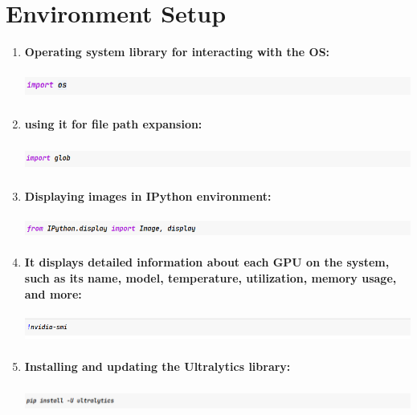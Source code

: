 \documentclass[12 pt]{report}
\begin{document}
\section{Environment Setup}
 {
  \begin{enumerate}
    \item \textbf{ Operating system library for interacting with the OS:}
          \begin{center}
            \includegraphics[width=17cm, height=1cm]{import Os.png}
          \end{center}

    \item \textbf{using it for file path expansion:}
          \begin{center}
            \includegraphics[width=17cm, height=1cm]{Import global.png}
          \end{center}

    \item \textbf{Displaying images in IPython environment:}
          \begin{center}
            \includegraphics[width=17cm, height=0.8cm]{Form Iphoton.display.png}
          \end{center}

    \item \textbf{ It displays detailed information about each GPU on the system, such as its name, model, temperature, utilization, memory usage, and more:}
          \begin{center}
            \includegraphics[width=17cm, height=1cm]{nvidia-smi.png}
          \end{center}

    \item \textbf{Installing and updating the Ultralytics library:}
          \begin{center}
            \includegraphics[width=17cm, height=1cm]{ipi install ultalatics.png}
          \end{center}



\end{enumerate}}
\end{document}
